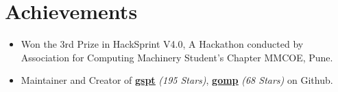 \documentclass[letterpaper,11pt]{article}
\begin{document}
\section{Achievements}

\begin{itemize}
    \item Won the 3rd Prize in HackSprint V4.0, A Hackathon conducted by Association for Computing Machinery Student’s
Chapter MMCOE, Pune.
    \item Maintainer and Creator of \href{https://github.com/aditya-K2/gspt}{\underline{\textbf{gspt}}} \textit{(195 Stars)}, \href{https://github.com/aditya-K2/gomp}{\underline{\textbf{gomp}}} \textit{(68 Stars)} on Github.
\end{itemize}
\end{document}
